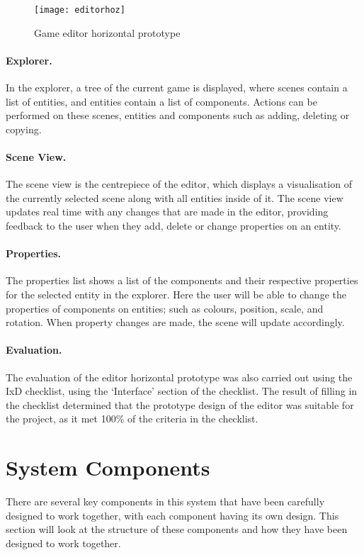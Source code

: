 	\begin{figure}[h]
		\centering
		\texttt{[image: editorhoz]}
		\caption{Game editor horizontal prototype}
		\label{fig:gameeditorprototype}
	\end{figure}

	\paragraph{Explorer.}
	In the explorer, a tree of the current game is displayed, where scenes contain a list of entities, and entities contain a list of components. Actions can be performed on these scenes, entities and components such as adding, deleting or copying.

	\paragraph{Scene View.}
	The scene view is the centrepiece of the editor, which displays a visualisation of the currently selected scene along with all entities inside of it. The scene view updates real time with any changes that are made in the editor, providing feedback to the user when they add, delete or change properties on an entity.

	\paragraph{Properties.}
	The properties list shows a list of the components and their respective properties for the selected entity in the explorer. Here the user will be able to change the properties of components on entities; such as colours, position, scale, and rotation. When property changes are made, the scene will update accordingly.

	\paragraph{Evaluation.}
	The evaluation of the editor horizontal prototype was also carried out using the IxD checklist, using the `Interface' section of the checklist.\cite{ixdchecklist} The result of filling in the checklist determined that the prototype design of the editor was suitable for the project, as it met 100\% of the criteria in the checklist.

\section{System Components}
There are several key components in this system that have been carefully designed to work together, with each component having its own design. This section will look at the structure of these components and how they have been designed to work together.

